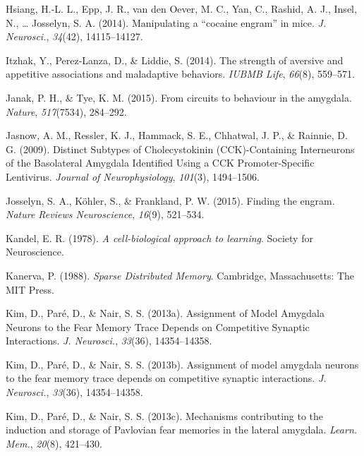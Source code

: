 \documentclass[12pt,a4paperpaper,]{report}
\begin{document}
\hypertarget{ref-hsiangux5fmanipulatingux5f2014}{}
Hsiang, H.-L. L., Epp, J. R., van den Oever, M. C., Yan, C., Rashid, A.
J., Insel, N., \ldots{} Josselyn, S. A. (2014). Manipulating a ``cocaine
engram'' in mice. \emph{J. Neurosci.}, \emph{34}(42), 14115--14127.

\hypertarget{ref-itzhakux5fstrengthux5f2014}{}
Itzhak, Y., Perez-Lanza, D., \& Liddie, S. (2014). The strength of
aversive and appetitive associations and maladaptive behaviors.
\emph{IUBMB Life}, \emph{66}(8), 559--571.

\hypertarget{ref-janakux5fcircuitsux5f2015}{}
Janak, P. H., \& Tye, K. M. (2015). From circuits to behaviour in the
amygdala. \emph{Nature}, \emph{517}(7534), 284--292.

\hypertarget{ref-jasnowux5fdistinctux5f2009}{}
Jasnow, A. M., Ressler, K. J., Hammack, S. E., Chhatwal, J. P., \&
Rainnie, D. G. (2009). Distinct Subtypes of Cholecystokinin
(CCK)-Containing Interneurons of the Basolateral Amygdala Identified
Using a CCK Promoter-Specific Lentivirus. \emph{Journal of
Neurophysiology}, \emph{101}(3), 1494--1506.

\hypertarget{ref-josselynux5ffindingux5f2015}{}
Josselyn, S. A., Köhler, S., \& Frankland, P. W. (2015). Finding the
engram. \emph{Nature Reviews Neuroscience}, \emph{16}(9), 521--534.

\hypertarget{ref-kandelux5fcell-biologicalux5f1978}{}
Kandel, E. R. (1978). \emph{A cell-biological approach to learning}.
Society for Neuroscience.

\hypertarget{ref-kanervaux5fsparseux5f1988}{}
Kanerva, P. (1988). \emph{Sparse Distributed Memory}. Cambridge,
Massachusetts: The MIT Press.

\hypertarget{ref-kimux5fassignmentux5f2013-1}{}
Kim, D., Paré, D., \& Nair, S. S. (2013a). Assignment of Model Amygdala
Neurons to the Fear Memory Trace Depends on Competitive Synaptic
Interactions. \emph{J. Neurosci.}, \emph{33}(36), 14354--14358.

\hypertarget{ref-kimux5fassignmentux5f2013}{}
Kim, D., Paré, D., \& Nair, S. S. (2013b). Assignment of model amygdala
neurons to the fear memory trace depends on competitive synaptic
interactions. \emph{J. Neurosci.}, \emph{33}(36), 14354--14358.

\hypertarget{ref-kimux5fmechanismsux5f2013-1}{}
Kim, D., Paré, D., \& Nair, S. S. (2013c). Mechanisms contributing to
the induction and storage of Pavlovian fear memories in the lateral
amygdala. \emph{Learn. Mem.}, \emph{20}(8), 421--430.
\end{document}
